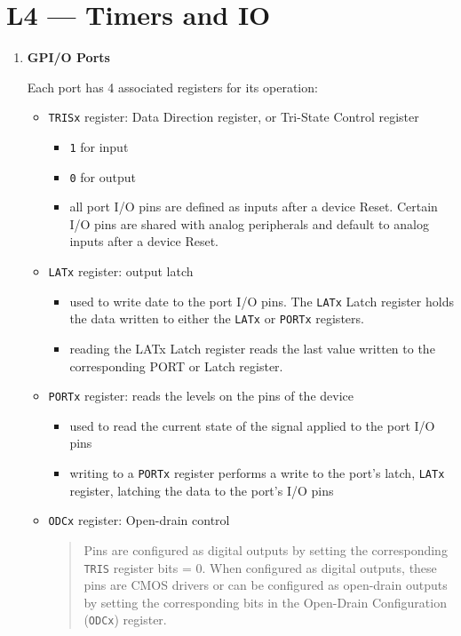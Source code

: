 \documentclass[a4paper]{article}
\begin{document}
\section*{L4 --- Timers and IO}
  \begin{enumerate}[label = \arabic*.]
    \item \textbf{GPI/O Ports}
      \par Each port has 4 associated registers for its operation:
      \begin{itemize}[leftmargin = 1cm]
        \item \verb|TRISx| register: Data Direction register, or Tri-State Control register
          \begin{itemize}[leftmargin = 1cm]
            \item \verb|1| for input
            \item \verb|0| for output
            \item all port I/O pins are defined as inputs after a device Reset. Certain I/O pins are shared with analog peripherals and default to analog inputs after a device Reset.
          \end{itemize}
        \item \verb|LATx| register: output latch
          \begin{itemize}[leftmargin = 1cm]
            \item used to write date to the port I/O pins. The \verb|LATx| Latch register holds the data written to either
              the \verb|LATx| or \verb|PORTx| registers.
            \item reading the LATx Latch register reads the last value written to the corresponding PORT or Latch register.
          \end{itemize}
        \item \verb|PORTx| register: reads the levels on the pins of the device
          \begin{itemize}[leftmargin = 1cm]
            \item used to read the current state of the signal applied to the port I/O pins
            \item writing to a \verb|PORTx| register performs a write to the port's latch, \verb|LATx| register, latching the data to the port's I/O pins
          \end{itemize}
        \item \verb|ODCx| register: Open-drain control
          \begin{quotation}
            \par Pins are configured as digital outputs by setting the corresponding \verb|TRIS| register bits = 0. When configured as digital outputs, these pins are CMOS drivers or can be configured as open-drain outputs by setting the corresponding bits in the Open-Drain Configuration (\verb|ODCx|) register.

\end{quotation}
\end{itemize}
\end{enumerate}
\end{document}
